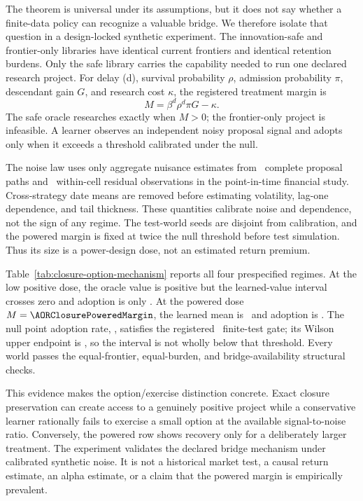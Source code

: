 The theorem is universal under its assumptions, but it does not say whether a
finite-data policy can recognize a valuable bridge. We therefore isolate that
question in a design-locked synthetic experiment. The innovation-safe and
frontier-only libraries have identical current frontiers and identical
retention burdens. Only the safe library carries the capability needed to run
one declared research project. For delay (d), survival probability \(\rho\),
admission probability \(\pi\), descendant gain \(G\), and research cost
\(\kappa\), the registered treatment margin is
\[
 M=\beta^d\rho^d\pi G-\kappa.
\]
The safe oracle researches exactly when \(M>0\); the frontier-only project is
infeasible. A learner observes an independent noisy proposal signal and adopts
only when it exceeds a threshold calibrated under the null.

The noise law uses only aggregate nuisance estimates from
\AORPointInTimeCompletePaths\ complete proposal paths and
\AORPointInTimeResidualObservations\ within-cell residual observations in the
point-in-time financial study. Cross-strategy date means are removed before
estimating volatility, lag-one dependence, and tail thickness. These
quantities calibrate noise and dependence, not the sign of any regime. The
test-world seeds are disjoint from calibration, and the powered margin is
fixed at twice the null threshold before test simulation. Thus its size is a
power-design dose, not an estimated return premium.

Table~\ref{tab:closure-option-mechanism} reports all four prespecified regimes.
At the low positive dose, the oracle value is positive but the learned-value
interval crosses zero and adoption is only \AORClosureLowDoseAdoption. At the
powered dose \(M=\AORClosurePoweredMargin\), the learned mean is
\AORClosurePoweredLearnedMean\ and adoption is
\AORClosurePoweredAdoption. The null point adoption rate,
\AORClosureNullAdoption, satisfies the registered
\AORClosureNullAdoptionGate\ finite-test gate;
its Wilson upper endpoint is \AORClosureNullWilsonUpper, so the interval is
not wholly below that threshold. Every world passes the equal-frontier,
equal-burden, and bridge-availability structural checks.

\AORClosureOptionTable

This evidence makes the option/exercise distinction concrete. Exact closure
preservation can create access to a genuinely positive project while a
conservative learner rationally fails to exercise a small option at the
available signal-to-noise ratio. Conversely, the powered row shows recovery
only for a deliberately larger treatment. The experiment validates the
declared bridge mechanism under calibrated synthetic noise. It is not a
historical market test, a causal return estimate, an alpha estimate, or a
claim that the powered margin is empirically prevalent.

